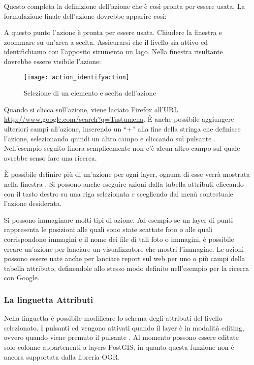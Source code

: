 Questo completa la definizione dell'azione che è così pronta per essere usata.
La formulazione finale dell'azione dovrebbe apparire così:

\begin{center}
\end{center}

A questo punto l'azione è pronta per essere usata. Chiudere la finestra
 e zoommare su un'area a scelta. Assicurarsi
che il livello  sia attivo ed identifichiamo con l'apposito
strumento un lago. Nella finestra risultante dovrebbe essere visibile l'azione:

\begin{figure}[H]
   \begin{center}
   \caption{Selezione di un elemento e scelta dell'azione \nixcaption}\label{fig:identify_action}\smallskip
   \texttt{[image: action\_identifyaction]} 
\end{center}  
\end{figure}

Quando si clicca sull'azione, viene laciato Firefox all'URL
\url{http://www.google.com/search?q=Tustumena}. È anche possibile aggiungere
ulteriori campi all'azione, inserendo un ``+'' alla fine della stringa che
definisce l'azione, selezionando quindi un altro campo e cliccando sul
pulsante . Nell'esempio seguito finora semplicemente non c'è alcun
altro campo sul quale avrebbe senso fare una ricerca.

È possibile definire più di un'azione per ogni layer, ognuna di esse verrà
mostrata nella finestra . Si possono anche
eseguire azioni dalla tabella attributi cliccando con il tasto destro su una
riga selezionata e scegliendo dal menù contestuale l'azione desiderata.

Si possono immaginare molti tipi di azione. Ad esempio se un layer di punti
rappresenta le posizioni alle quali sono state scattate foto o alle quali
corrispondono immagini e il nome dei file di tali foto o immagini, è possibile
creare un'azione per lanciare un visualizzatore che mostri l'immagine. Le
azioni possono essere uate anche per lanciare report sul web per uno o più
campi della tabella attributo, definendole allo stesso modo definito
nell'esempio per la ricerca con Google.

\subsubsection{La linguetta Attributi}\label{label_attributes}
Nella linguetta  è possibile modificare lo schema degli
attributi del livello selezionato. I pulsanti  ed
 vengono attivati quando il layer è in modalità
editing, ovvero quando viene premuto il pulsante  . Al momento possono essere editate solo colonne appartenenti a layers
PostGIS, in quanto questa funzione non è ancora supportata dalla libreria OGR. 

